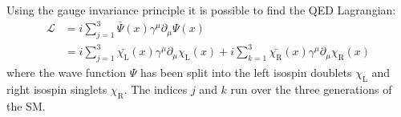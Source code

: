Using the gauge invariance principle it is possible to find the QED Lagrangian: %
\begin{equation}\label{eq:chap1:EW:LagrangianFree}
\begin{split}
	\mathcal{L} 	&= i \sum_{j=1}^{3} \bar{\Psi}(x) \gamma^{\mu} \partial_{\mu} \Psi(x) \\
				& = i \sum_{j=1}^{3} \bar{\chi_\text{L}}(x) \gamma^{\mu} \partial_{\mu} \chi_\text{L}(x)+  i \sum_{k=1}^{3} \bar{\chi_\text{R}}(x) \gamma^{\mu} \partial_{\mu} \chi_\text{R}(x)
\end{split}
\end{equation}
where the wave function $\Psi$ has been split into the left isospin doublets $\chi_\text{L}$ and right isospin singlets $\chi_\text{R}$. 
The indices $j$ and $k$ run over 
the three generations of the SM. 


